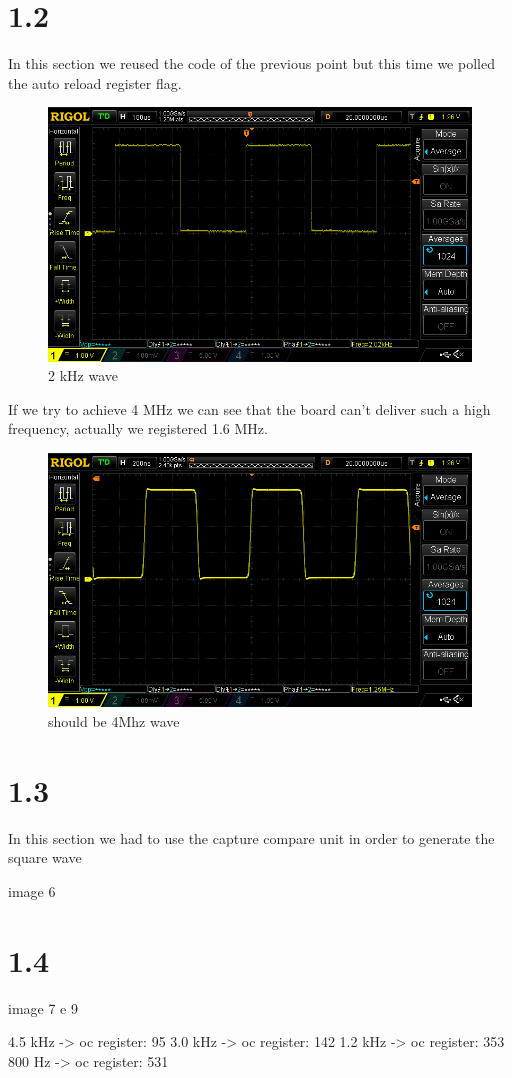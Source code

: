 \documentclass[12pt]{article}
\begin{document}
\section*{1.2 }
In this section we reused the code of the previous point but this time we polled the auto reload register flag.\\
\begin{figure}[h!]
	
	\includegraphics[scale = 0.4]{immagini/DS1Z_QuickPrint4}
	\caption{2 kHz wave }
\end{figure}
If we try to achieve 4 MHz we can see that the board can't deliver such a high frequency, actually we registered 1.6 MHz. 
\begin{figure}[h!]
	
	\includegraphics[scale = 0.4]{immagini/DS1Z_QuickPrint3}
	\caption{should be 4Mhz wave }
\end{figure}


\section*{1.3}
In this section we had to use the capture compare unit in order to generate the square wave

image 6

\section*{1.4 }
image 7 e 9

4.5 kHz -> oc register: 95
3.0 kHz -> oc register: 142
1.2 kHz -> oc register: 353
800 Hz  -> oc register: 531
\end{document}

